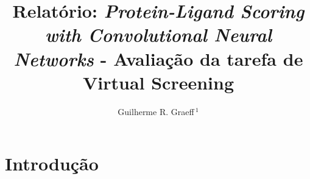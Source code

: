 \documentclass[utf8]{frontiersSCNS} %
\def\keyFont{\fontsize{8}{11}\helveticabold }
\def\firstAuthorLast{} %
\def\Authors{Guilherme R. Graeff\,$^{1}$}
\begin{document}
\onecolumn
{}

\title[Relatório]{Relatório: \textit{Protein-Ligand Scoring with Convolutional Neural Networks} - Avaliação da tarefa de Virtual Screening} 

\author[\firstAuthorLast ]{\Authors} %
\address{} %
\correspondance{} %

\extraAuth{}%


\maketitle












\section{Introdução}
\end{document}
